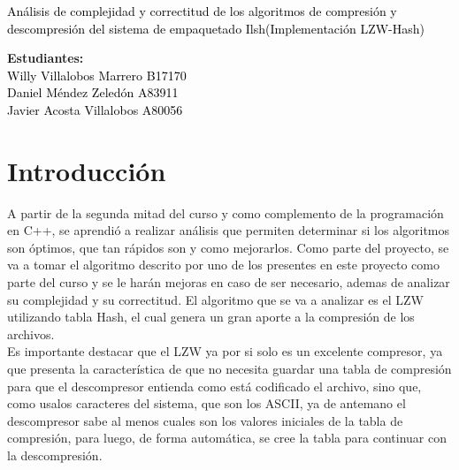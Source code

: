 \documentclass[letterpaper]{article}
\newcommand{\uic}{black} %
\newcommand{\uim}{} %
\newcommand{\userinput}[1]{\textcolor{\uic}{\uim#1\uim}}
\begin{document}
\vspace*{2cm}

\begin{center}
\Huge
\userinput{Análisis de complejidad y correctitud de los algoritmos de compresión y descompresión del sistema de empaquetado Ilsh(Implementación LZW-Hash)}
\vspace*{1cm}
\end{center}

\noindent
\small\baselineskip=14pt
\textbf{Estudiantes:}\\
\userinput{Willy Villalobos Marrero B17170}\\
\userinput{Daniel Méndez Zeledón A83911}\\
\userinput{Javier Acosta Villalobos A80056}\\


\section{Introducción}

A partir de la segunda mitad del curso y como complemento de la programación en C++, se aprendió a realizar análisis que permiten determinar si los algoritmos son óptimos, que tan rápidos son y como mejorarlos. Como parte del proyecto, se va a tomar el algoritmo descrito por uno de los presentes en este proyecto como parte del curso y se le harán mejoras en caso de ser necesario, ademas de analizar su complejidad y su correctitud. El algoritmo que se va a analizar es el LZW utilizando tabla Hash, el cual genera un gran aporte a la compresión de los archivos.\\

Es importante destacar que el LZW ya por si solo es un excelente compresor, ya que presenta la característica de que no necesita guardar una tabla de compresión para que el descompresor entienda como está codificado el archivo, sino que, como usalos caracteres del sistema, que son los ASCII, ya de antemano el descompresor sabe al menos cuales son los valores iniciales de la tabla de compresión, para luego, de forma automática, se cree la tabla para continuar con la descompresión.\\
\end{document}

